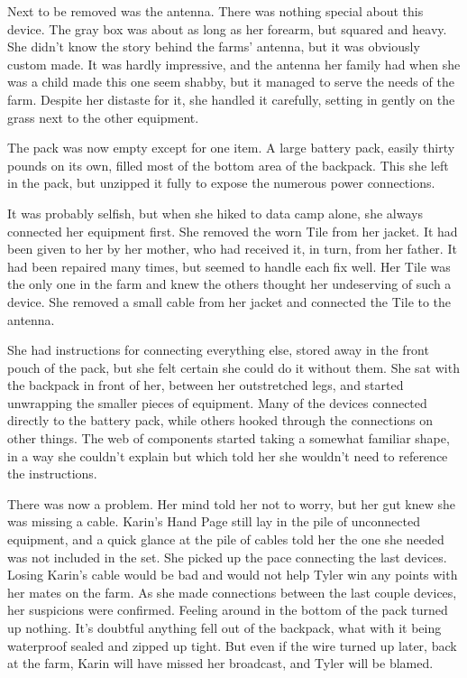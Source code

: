 \documentclass[12pt,novel,nonsubmission,smart]{sffms}
\begin{document}
Next to be removed was the antenna. There was nothing special
about this device. The gray box was about as long as her forearm,
but squared and heavy. She didn't know the story behind the
farms' antenna, but it was obviously custom made. It was hardly
impressive, and the antenna her family had when she was a child
made this one seem shabby, but it managed to serve the needs of
the farm. Despite her distaste for it, she handled it carefully,
setting in gently on the grass next to the other equipment.

The pack was now empty except for one item. A large battery
pack, easily thirty pounds on its own, filled most of the bottom
area of the backpack. This she left in the pack, but unzipped it
fully to expose the numerous power connections.

It was probably selfish, but when she hiked to data camp alone,
she always connected her equipment first. She removed the worn
Tile from her jacket. It had been given to her by her mother,
who had received it, in turn, from her father. It had been
repaired many times, but seemed to handle each fix well. Her
Tile was the only one in the farm and knew the others thought
her undeserving of such a device. She removed a small cable from
her jacket and connected the Tile to the antenna.

She had instructions for connecting everything else, stored away
in the front pouch of the pack, but she felt certain she could
do it without them. She sat with the backpack in front of her,
between her outstretched legs, and started unwrapping the
smaller pieces of equipment. Many of the devices connected
directly to the battery pack, while others hooked through the
connections on other things. The web of components started
taking a somewhat familiar shape, in a way she couldn't explain
but which told her she wouldn't need to reference the
instructions.

There was now a problem. Her mind told her not to worry, but her
gut knew she was missing a cable. Karin's Hand Page still lay in
the pile of unconnected equipment, and a quick glance at the
pile of cables told her the one she needed was not included in
the set. She picked up the pace connecting the last devices.
Losing Karin's cable would be bad and would not help Tyler win
any points with her mates on the farm. As she made connections
between the last couple devices, her suspicions were confirmed.
Feeling around in the bottom of the pack turned up nothing. It's
doubtful anything fell out of the backpack, what with it being
waterproof sealed and zipped up tight. But even if the wire
turned up later, back at the farm, Karin will have missed her
broadcast, and Tyler will be blamed.
\end{document}
